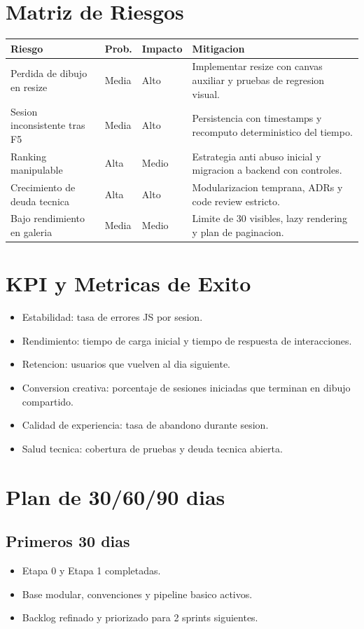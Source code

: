 \documentclass[12pt,a4paper]{article}
\begin{document}
\section{Matriz de Riesgos}
\begin{longtable}{|p{}|p{}|p{}|p{}|}
\hline
\textbf{Riesgo} & \textbf{Prob.} & \textbf{Impacto} & \textbf{Mitigacion} \\\hline
Perdida de dibujo en resize & Media & Alto & Implementar resize con canvas auxiliar y pruebas de regresion visual. \\\hline
Sesion inconsistente tras F5 & Media & Alto & Persistencia con timestamps y recomputo deterministico del tiempo. \\\hline
Ranking manipulable & Alta & Medio & Estrategia anti abuso inicial y migracion a backend con controles. \\\hline
Crecimiento de deuda tecnica & Alta & Alto & Modularizacion temprana, ADRs y code review estricto. \\\hline
Bajo rendimiento en galeria & Media & Medio & Limite de 30 visibles, lazy rendering y plan de paginacion. \\\hline
\end{longtable}

\section{KPI y Metricas de Exito}
\begin{itemize}
  \item Estabilidad: tasa de errores JS por sesion.
  \item Rendimiento: tiempo de carga inicial y tiempo de respuesta de interacciones.
  \item Retencion: usuarios que vuelven al dia siguiente.
  \item Conversion creativa: porcentaje de sesiones iniciadas que terminan en dibujo compartido.
  \item Calidad de experiencia: tasa de abandono durante sesion.
  \item Salud tecnica: cobertura de pruebas y deuda tecnica abierta.
\end{itemize}

\section{Plan de 30/60/90 dias}
\subsection{Primeros 30 dias}
\begin{itemize}
  \item Etapa 0 y Etapa 1 completadas.
  \item Base modular, convenciones y pipeline basico activos.
  \item Backlog refinado y priorizado para 2 sprints siguientes.
\end{itemize}
\end{document}
